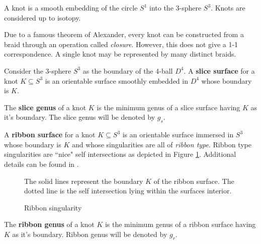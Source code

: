 \documentclass[12pt]{thesis}
\begin{document}
\begin{definition}
    A knot is a smooth embedding of the circle $S^{1}$ into the 3-sphere $S^{3}$.
    Knots are considered up to isotopy.
\end{definition}

Due to a famous theorem of Alexander, every knot 
can be constructed from a braid through an operation
called \textit{closure}.
However, this does not give a 1-1 correspondence.
A single knot may be represented by many distinct braids.

\begin{definition}
Consider the 3-sphere $S^{3}$ as the boundary of the 4-ball $D^{4}$.
A \textbf{slice surface} for a knot $K \subseteq S^{3}$
is an orientable surface smoothly embedded in $D^{4}$ 
whose boundary is $K$.
\end{definition}

\begin{definition}
    The \textbf{slice genus} of a knot $K$ is the minimum genus
    of a slice surface having $K$ as it's boundary.
    The slice genus will be denoted by $g_{s}$.
\end{definition}

\begin{definition}
    A \textbf{ribbon surface} for a knot $K \subseteq S^{3}$
    is an orientable surface immersed in $S^{3}$
    whose boundary is $K$
    and whose singularities are all of \textit{ribbon type}.
    Ribbon type singularities are ``nice" self intersections
    as depicted in Figure \ref{fig:ribbon-singularity}.
    Additional details can be found in \cite{on-braided-surfaces}.
\end{definition}

\begin{figure}[h]
    \centering
    \def\svgwidth{6cm}
    
    \caption{Ribbon singularity}

    The solid lines represent the boundary $K$
    of the ribbon surface. The dotted line
    is the self intersection lying within the
    surfaces interior.
    \label{fig:ribbon-singularity}
\end{figure}


\begin{definition}
    The \textbf{ribbon genus} of a knot $K$ is the minimum genus
    of a ribbon surface having $K$ as it's boundary.
    Ribbon genus will be denoted by $g_{r}$.
\end{definition}
\end{document}
